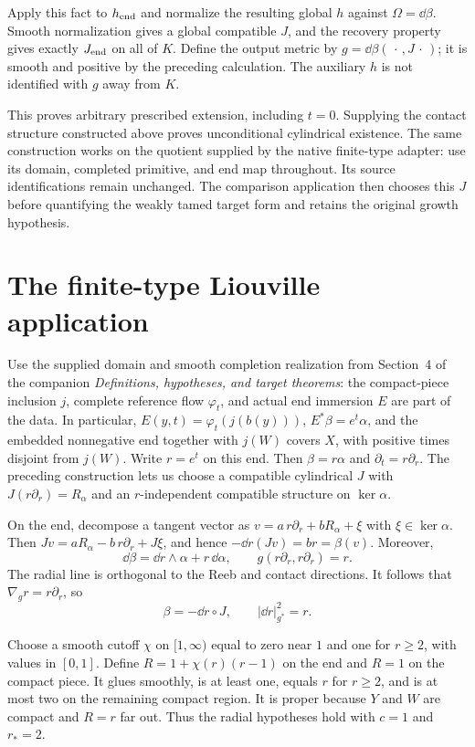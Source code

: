 Apply this fact to $h_{\rm end}$ and normalize the resulting global
$h$ against $\Omega=\dd\beta$. Smooth normalization gives a global
compatible $J$, and the recovery property gives exactly $J_{\rm end}$
on all of $K$. Define the output metric by
$g=\dd\beta(\,\cdot\,,J\,\cdot\,)$; it is smooth and positive by
the preceding calculation. The auxiliary $h$ is not identified with
$g$ away from $K$.

This proves arbitrary prescribed extension, including $t=0$.
Supplying the contact structure constructed above proves unconditional
cylindrical existence. The same construction works on the quotient
supplied by the native finite-type adapter: use its domain, completed
primitive, and end map throughout. Its source identifications remain
unchanged. The comparison application then chooses this $J$ before
quantifying the weakly tamed target form and retains the original
growth hypothesis.

\section{The finite-type Liouville application}
Use the supplied domain and smooth completion realization from
Section~4 of the companion \emph{Definitions, hypotheses, and target
theorems}: the compact-piece inclusion $j$, complete reference flow
$\varphi_t$, and actual end immersion $E$ are part of the data.
In particular, $E(y,t)=\varphi_t(j(b(y)))$, $E^*\beta=e^t\alpha$,
and the embedded nonnegative end together with $j(W)$ covers $X$,
with positive times disjoint from $j(W)$. Write $r=e^t$ on this end.
Then $\beta=r\alpha$ and $\partial_t=r\partial_r$.
The preceding construction lets us choose a compatible cylindrical $J$ with
$J(r\partial_r)=R_\alpha$ and an $r$-independent compatible
structure on $\ker\alpha$.

On the end, decompose a tangent vector as
$v=a\,r\partial_r+bR_\alpha+\xi$ with $\xi\in\ker\alpha$.
Then
$Jv=aR_\alpha-b\,r\partial_r+J\xi$, and hence
$-\dd r(Jv)=br=\beta(v)$.
Moreover,
\[
 \dd\beta=\dd r\wedge\alpha+r\,\dd\alpha,\qquad
 g(r\partial_r,r\partial_r)=r .
\]
The radial line is orthogonal to the Reeb and contact directions.
It follows that $\nabla_g r=r\partial_r$, so
\[
 \beta=-\dd r\circ J,\qquad |\dd r|_{g^*}^2=r .
\]

Choose a smooth cutoff $\chi$ on $[1,\infty)$ equal to zero
near $1$ and one for $r\ge2$, with values in $[0,1]$.
Define $R=1+\chi(r)(r-1)$ on the end and $R=1$ on the compact
piece. It glues smoothly, is at least one, equals $r$ for $r\ge2$,
and is at most two on the remaining compact region.
It is proper because $Y$ and $W$ are compact and $R=r$ far out.
Thus the radial hypotheses hold with $c=1$ and $r_*=2$.

